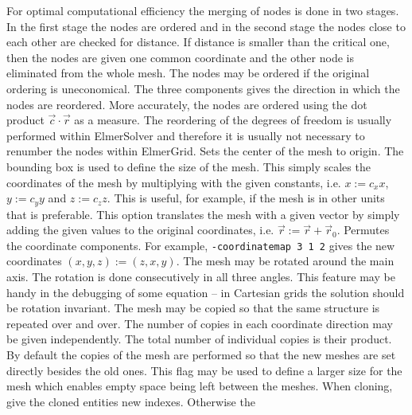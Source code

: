 For optimal computational efficiency the merging of nodes is done 
in two stages. In the first stage the nodes are ordered and in the second
stage the nodes close to each other are checked for distance. 
If distance is smaller than the critical one, then the nodes are given one
common coordinate and the other node is eliminated from the whole mesh.
%
The nodes may be ordered if the original ordering is uneconomical.
The three components gives the direction in which the nodes are reordered.
More accurately, the nodes are ordered using the 
dot product $\vec{c}\cdot\vec{r}$ as a measure.
%
The reordering of the degrees of freedom is usually performed 
within ElmerSolver and therefore 
it is usually not necessary to renumber the nodes within ElmerGrid.
%
Sets the center of the mesh to origin. The bounding box is used to define the size of the mesh. 
%
%
This simply scales the coordinates of the mesh by 
multiplying with the given constants, i.e.
$x:=c_x x$, $y:=c_y y$ and $z:=c_z z$.
This is useful, for example, if the mesh is in other units that is 
preferable. 
%
This option translates the mesh with a given vector by
simply adding the given values to the original coordinates,
i.e. $\vec{r} := \vec{r} + \vec{r}_0$.
%
Permutes the coordinate components. For example,
\texttt{-coordinatemap 3 1 2} gives the new coordinates
$(x,y,z) := (z,x,y)$.
%
The mesh may be rotated around the main axis. 
The rotation is done consecutively in all three angles.
This feature may be handy in the debugging of some equation --
in Cartesian grids the solution should be rotation invariant.
%
The mesh may be copied so that the same 
structure is repeated over and over. The number of copies in 
each coordinate direction may be given independently.
The total number of individual copies is their product.
%
By default the copies of the mesh are performed so that the 
new meshes are set directly besides the old ones. This flag may be used to define
a larger size for the mesh which enables empty space being left 
between the meshes.
%
When cloning, give the cloned entities new indexes. Otherwise the
